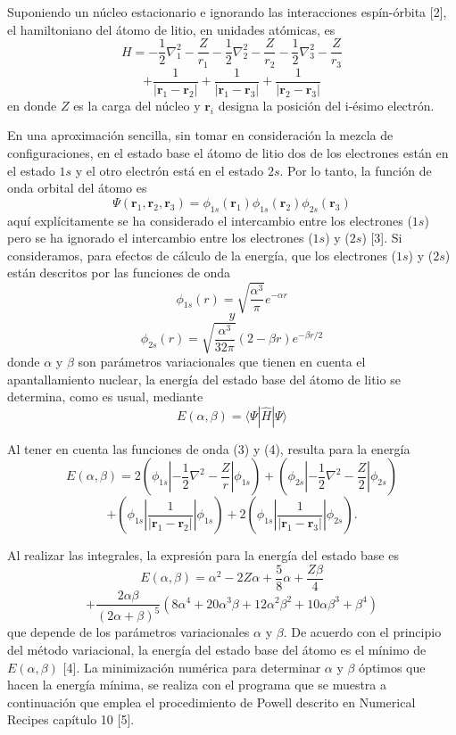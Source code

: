 \documentclass{article}
\begin{document}
Suponiendo un núcleo estacionario e ignorando las interacciones espín-órbita [2], el hamiltoniano del átomo de litio, en unidades atómicas, es
\[
H = -\frac{1}{2} \nabla_1^2 - \frac{Z}{r_1} - \frac{1}{2} \nabla_2^2 - \frac{Z}{r_2} - \frac{1}{2} \nabla_3^2 - \frac{Z}{r_3}
\]
\[
+ \frac{1}{|\mathbf{r}_1 - \mathbf{r}_2|} + \frac{1}{|\mathbf{r}_1 - \mathbf{r}_3|} + \frac{1}{|\mathbf{r}_2 - \mathbf{r}_3|}
\]
en donde \( Z \) es la carga del núcleo y \( \mathbf{r}_i \) designa la posición del i-ésimo electrón.

En una aproximación sencilla, sin tomar en consideración la mezcla de configuraciones, en el estado base el átomo de litio dos de los electrones están en el estado \(1s\) y el otro electrón está en el estado \(2s\). Por lo tanto, la función de onda orbital del átomo es
\[
\Psi(\mathbf{r}_1, \mathbf{r}_2, \mathbf{r}_3) = \phi_{1s}(\mathbf{r}_1)\phi_{1s}(\mathbf{r}_2)\phi_{2s}(\mathbf{r}_3)
\]
aquí explícitamente se ha considerado el intercambio entre los electrones (\(1s\)) pero se ha ignorado el intercambio entre los electrones (\(1s\)) y (\(2s\)) [3]. Si consideramos, para efectos de cálculo de la energía, que los electrones (\(1s\)) y (\(2s\)) están descritos por las funciones de onda
\[
\phi_{1s}(r) = \sqrt{\frac{\alpha^3}{\pi}} e^{-\alpha r}
\]
\[
y
\]
\[
\phi_{2s}(r) = \sqrt{\frac{\alpha^3}{32\pi}}(2 - \beta r)e^{-\beta r/2}
\]
donde \( \alpha \) y \( \beta \) son parámetros variacionales que tienen en cuenta el apantallamiento nuclear, la energía del estado base del átomo de litio se determina, como es usual, mediante
\[
E(\alpha, \beta) = \langle \Psi | \hat{H} | \Psi \rangle
\]

Al tener en cuenta las funciones de onda (3) y (4), resulta para la energía
\[
E(\alpha, \beta) = 2\left(\phi_{1s} \left| -\frac{1}{2} \nabla^2 - \frac{Z}{r} \right| \phi_{1s}\right) + \left(\phi_{2s} \left| -\frac{1}{2} \nabla^2 - \frac{Z}{2} \right| \phi_{2s}\right)
\]
\[
+ \left(\phi_{1s} \left| \frac{1}{|\mathbf{r}_1 - \mathbf{r}_2|} \right| \phi_{1s}\right) + 2\left(\phi_{1s} \left| \frac{1}{|\mathbf{r}_1 - \mathbf{r}_3|} \right| \phi_{2s}\right).
\]

Al realizar las integrales, la expresión para la energía del estado base es
\[
E(\alpha, \beta) = \alpha^2 - 2Z\alpha + \frac{5}{8}\alpha + \frac{Z\beta}{4}
\]
\[
+ \frac{2\alpha\beta}{(2\alpha + \beta)^5}(8\alpha^4 + 20\alpha^3\beta + 12\alpha^2\beta^2 + 10\alpha\beta^3 + \beta^4)
\]
que depende de los parámetros variacionales \( \alpha \) y \( \beta \). De acuerdo con el principio del método variacional, la energía del estado base del átomo es el mínimo de \( E(\alpha, \beta) \) [4]. La minimización numérica para determinar \( \alpha \) y \( \beta \) óptimos que hacen la energía mínima, se realiza con el programa que se muestra a continuación que emplea el procedimiento de Powell descrito en Numerical Recipes capítulo 10 [5].
\end{document}
